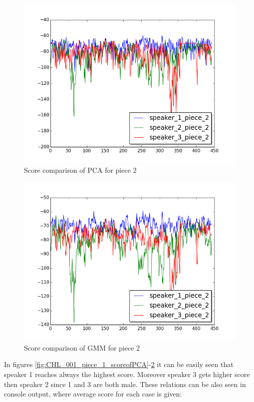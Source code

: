 \documentclass[magister]{dyplom}
\begin{document}
	\begin{figure}[th!]
		\centering
		\includegraphics[width=0.7\linewidth]{"images/simulation/CHL_003_piece_2_score of PCA"}
		\caption{Score comparison of \gls{PCA} for piece 2}
		\label{fig:CHL_001_piece_2_scoreofPCA}
	\end{figure}
	
	\begin{figure}[th!]
		\centering
		\includegraphics[width=0.7\linewidth]{"images/simulation/CHL_004_piece_2_score of GMM"}
		\caption{Score comparison of \gls{GMM} for piece 2}
		\label{fig:CHL_002_piece_2_scoreofGMM}
	\end{figure}

	\FloatBarrier

	In figures \ref{fig:CHL_001_piece_1_scoreofPCA}-\ref{fig:CHL_002_piece_2_scoreofGMM} it can be easily seen that speaker 1 reaches always the highest score. Moreover speaker 3 gets higher score then speaker 2 since 1 and 3 are both male. These relations can be also seen in console output, where average score for each case is given:\\
	
	\inputminted{bash}{images/simulation/AAA_console_out}
	
\end{document}
